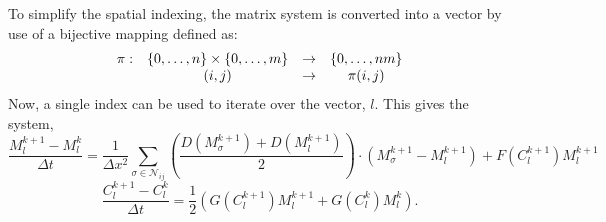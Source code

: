 To simplify the spatial indexing, the matrix system is converted into a vector by use of a bijective mapping defined as:
\begin{equation}
\begin{array}{c c c c}
  \pi :& \{ 0, \ldots, n\} \times \{0, \ldots, m\} & \to & \{0, \ldots, nm \} \\
       & (i,j)                                     & \to & \pi(i,j)
\end{array}
\end{equation}
Now, a single index can be used to iterate over the vector, $l$. 
This gives the system,
\begin{equation} \label{equ:M_space_discret}
  \frac{M^{k+1}_{l} - M^{k}_{l}}{\Delta t} =
    \frac{1}{\Delta x^2} \sum_{\sigma \in \mathcal{N}_{ij}}
    \left( \frac{D(M^{k+1}_{\sigma}) + D(M^{k+1}_{l})}{2} \right)
    \cdot \left( M^{k+1}_{\sigma} - M^{k+1}_{l} \right)
    + F(C^{k+1}_{l}) M^{k+1}_{l}
\end{equation}
\begin{equation} \label{equ:C_space_discret}
  \frac{C^{k+1}_{l} - C^{k}_{l}}{\Delta t} = \frac{1}{2} ( G(C^{k+1}_{l}) M^{k+1}_{l} + G(C^{k}_{l}) M^{k}_{l} ).
\end{equation}

